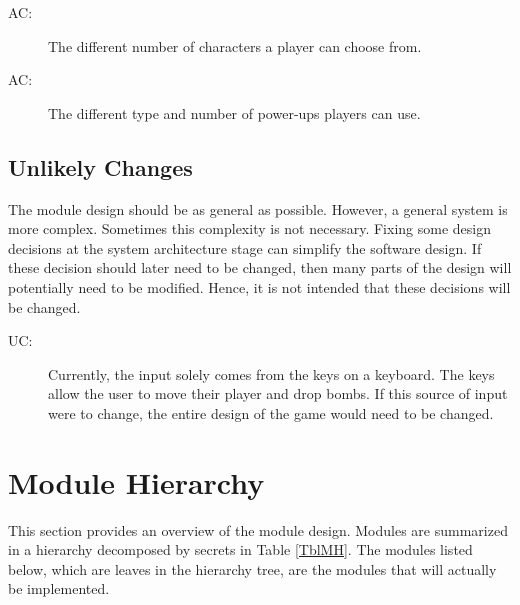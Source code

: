 \documentclass[12pt, titlepage]{article}
\newcounter{acnum}
\newcommand{\actheacnum}{AC\theacnum}
\newcounter{ucnum}
\newcommand{\uctheucnum}{UC\theucnum}
\begin{document}
\begin{description}
\item[ \actheacnum \label{acInput}:] The different number of characters a player can choose from.
\item[ \actheacnum \label{acInput}:] The different type and number of power-ups players can use.

\end{description}

\subsection{Unlikely Changes} \label{SecUchange}

The module design should be as general as possible. However, a general system is
more complex. Sometimes this complexity is not necessary. Fixing some design
decisions at the system architecture stage can simplify the software design. If
these decision should later need to be changed, then many parts of the design
will potentially need to be modified. Hence, it is not intended that these
decisions will be changed.

\begin{description}
\item[ \uctheucnum \label{ucIO}:] 
Currently, the input solely comes from the keys on a keyboard. The keys allow the user to move their player and drop bombs. If this source of input were to change, the entire design of the game would need to be changed.  

\end{description}

\section{Module Hierarchy} \label{SecMH}

This section provides an overview of the module design. Modules are summarized
in a hierarchy decomposed by secrets in Table \ref{TblMH}. The modules listed
below, which are leaves in the hierarchy tree, are the modules that will
actually be implemented.
\end{document}

